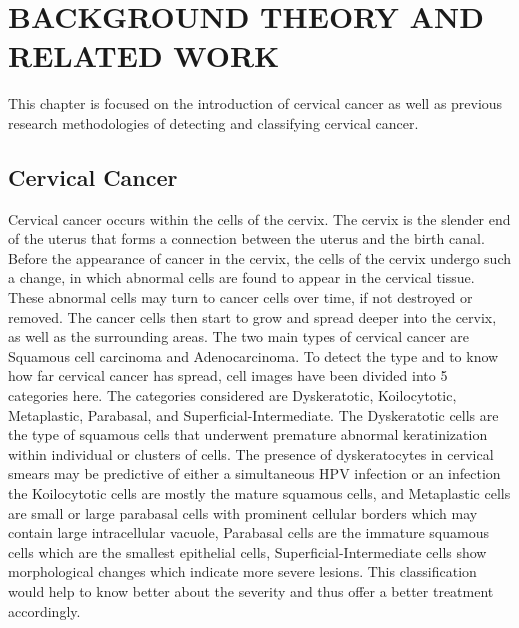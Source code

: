 \chapter{BACKGROUND THEORY AND RELATED WORK}
This chapter is focused on the introduction of cervical cancer as well as previous research methodologies of detecting and classifying cervical cancer.



\section{Cervical Cancer}

Cervical cancer occurs within the cells of the cervix. The cervix is the slender end of the uterus that forms a connection between the uterus and the birth canal. Before the appearance of cancer in the cervix, the cells of the cervix undergo such a change, in which abnormal cells are found to appear in the cervical tissue. These abnormal cells may turn to cancer cells over time, if not destroyed or removed. The cancer cells then start to grow and spread deeper into the cervix, as well as the surrounding areas. The two main types of cervical cancer are Squamous cell carcinoma and Adenocarcinoma. To detect the type and to know how far cervical cancer has spread, cell images have been divided into 5 categories here. The categories considered are Dyskeratotic, Koilocytotic, Metaplastic, Parabasal, and Superficial-Intermediate. The Dyskeratotic cells are the type of squamous cells that underwent premature abnormal
keratinization within individual or clusters of cells. The presence of dyskeratocytes in cervical smears may be predictive of either a simultaneous HPV infection or an infection the Koilocytotic cells are mostly the mature squamous cells, and Metaplastic cells are small or large parabasal cells with prominent cellular borders which may contain large intracellular vacuole, Parabasal cells are the immature squamous cells which are the smallest epithelial cells, Superficial-Intermediate cells show morphological changes
which indicate more severe lesions. This classification would help to know better about the severity and thus offer a better treatment accordingly.


